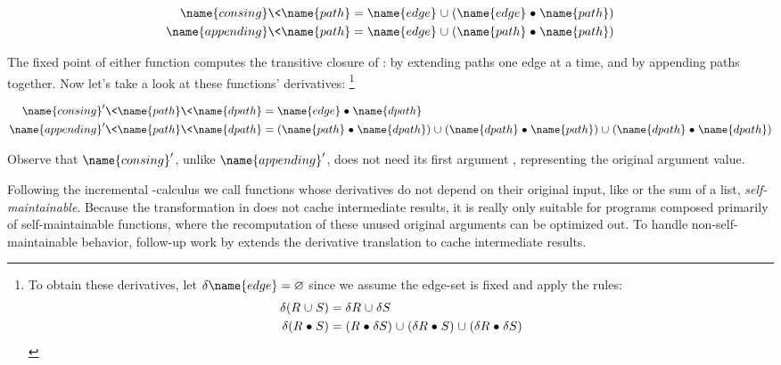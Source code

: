 \begin{align*}
  \name{consing} \<\name{path}
  &= \name{edge} \cup (\name{edge} \relcomp \name{path})
  \\
  \name{appending} \<\name{path}
  &= \name{edge} \cup (\name{path} \relcomp \name{path})
\end{align*}

\noindent
The fixed point of either function computes the transitive closure of
:  by extending paths one edge at a time, and
 by appending paths together. Now let's take a look at these
functions' derivatives:%
%
\footnote{To obtain these derivatives, let $\delta \name{edge} = \varnothing$
  since we assume the edge-set is fixed and apply the rules:
  \begin{align*}
  \delta(R \cup S) &= \delta R \cup \delta S
  \\
  \delta(R \relcomp S) &=
  (R \relcomp \delta S) \cup (\delta R \relcomp S) \cup (\delta R \relcomp \delta S)
  \end{align*}}

\begin{align*}
  \name{consing}' \<\name{path} \<\name{dpath}
  &= \name{edge} \relcomp \name{dpath}
  \\
  \name{appending}' \<\name{path} \<\name{dpath}
  &= (\name{path} \relcomp \name{dpath})
  \cup (\name{dpath} \relcomp \name{path})
  \cup (\name{dpath} \relcomp \name{dpath})
\end{align*}

\noindent
Observe that $\name{consing}'$, unlike $\name{appending}'$, does not need its
first argument , representing the original argument value.

Following the incremental \fn-calculus we call functions whose derivatives do
not depend on their original input, like  or the sum of a
list, \emph{self-maintainable}.
%
Because the transformation in \citet{incremental} does not cache intermediate results, it is really only suitable for programs composed primarily of self-maintainable functions, where the recomputation of these unused original arguments can be optimized out.
%
%
To handle non-self-maintainable behavior, follow-up work by \citet{DBLP:conf/esop/GiarrussoRS19} extends the derivative
translation to cache intermediate results.
%

